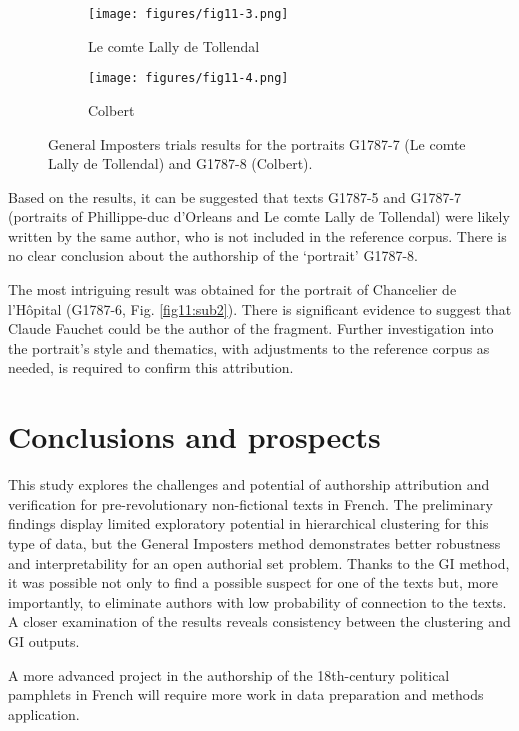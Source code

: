\documentclass[12pt, letterpaper]{article}
\begin{document}
\begin{figure}
\begin{subfigure}{.5\textwidth}
  \centering
  \texttt{[image: figures/fig11-3.png]}
  \caption{Le comte Lally de Tollendal}
\end{subfigure}
\begin{subfigure}{.5\textwidth}
  \centering
  \texttt{[image: figures/fig11-4.png]}
  \caption{Colbert}
\end{subfigure}
\caption{General Imposters trials results for the portraits G1787-7 (Le comte Lally de Tollendal) and G1787-8 (Colbert).}
\label{fig11-2}
\end{figure}

Based on the results, it can be suggested that texts G1787-5 and G1787-7 (portraits of Phillippe-duc d'Orleans and Le comte Lally de Tollendal) were likely written by the same author, who is not included in the reference corpus. There is no clear conclusion about the authorship of the ‘portrait’ G1787-8.

The most intriguing result was obtained for the portrait of Chancelier de l'Hôpital (G1787-6, Fig. \ref{fig11:sub2}). There is significant evidence to suggest that Claude Fauchet could be the author of the fragment. Further investigation into the portrait's style and thematics, with adjustments to the reference corpus as needed, is required to confirm this attribution.

\section{Conclusions and prospects}
This study explores the challenges and potential of authorship attribution and verification for pre-revolutionary non-fictional texts in French. The preliminary findings display limited exploratory potential in hierarchical clustering for this type of data, but the General Imposters method demonstrates better robustness and interpretability for an open authorial set problem. Thanks to the GI method, it was possible not only to find a possible suspect for one of the texts but, more importantly, to eliminate authors with low probability of connection to the texts. A closer examination of the results reveals consistency between the clustering and GI outputs.

A more advanced project in the authorship of the 18th-century political pamphlets in French will require more work in data preparation and methods application.
\end{document}
